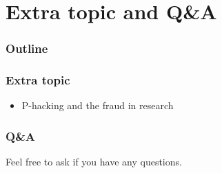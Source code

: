 \documentclass{beamer}
\begin{document}
\section{Extra topic and Q\&A}
\begin{frame}
    \frametitle{Outline}
    \tableofcontents[currentsection]
\end{frame}

\begin{frame}
    \frametitle{Extra topic}
    \begin{itemize}
        \item P-hacking and the fraud in research
        
    \end{itemize}
    

\end{frame}


\begin{frame}
    \frametitle{Q\&A}
    
    Feel free to ask if you have any questions.\par
    
    
    
\end{frame}
\end{document}
